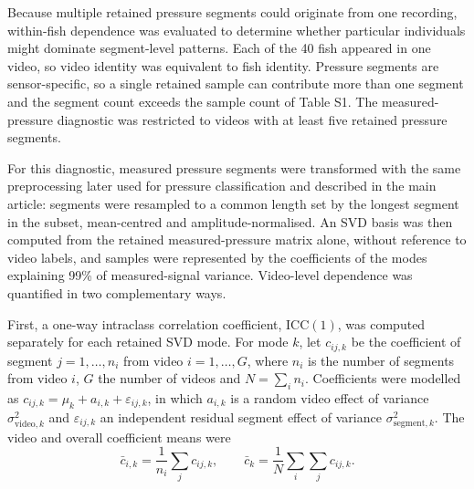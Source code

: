 \documentclass[11pt,a4paper]{article}
\begin{document}
Because multiple retained pressure segments could originate from one recording, within-fish dependence was evaluated to determine whether particular individuals might dominate segment-level patterns. Each of the 40 fish appeared in one video, so video identity was equivalent to fish identity. Pressure segments are sensor-specific, so a single retained sample can contribute more than one segment and the segment count exceeds the sample count of Table S1. The measured-pressure diagnostic was restricted to videos with at least five retained pressure segments.

For this diagnostic, measured pressure segments were transformed with the same preprocessing later used for pressure classification and described in the main article: segments were resampled to a common length set by the longest segment in the subset, mean-centred and amplitude-normalised. An SVD basis was then computed from the retained measured-pressure matrix alone, without reference to video labels, and samples were represented by the coefficients of the modes explaining 99\% of measured-signal variance. Video-level dependence was quantified in two complementary ways.

First, a one-way intraclass correlation coefficient, \(\mathrm{ICC}(1)\), was computed separately for each retained SVD mode. For mode \(k\), let \(c_{ij,k}\) be the coefficient of segment \(j=1,\dots,n_i\) from video \(i=1,\dots,G\), where \(n_i\) is the number of segments from video \(i\), \(G\) the number of videos and \(N=\sum_i n_i\). Coefficients were modelled as \(c_{ij,k}=\mu_k+a_{i,k}+\varepsilon_{ij,k}\), in which \(a_{i,k}\) is a random video effect of variance \(\sigma^2_{\mathrm{video},k}\) and \(\varepsilon_{ij,k}\) an independent residual segment effect of variance \(\sigma^2_{\mathrm{segment},k}\). The video and overall coefficient means were
\begin{equation}
\bar c_{i,k}=\frac{1}{n_i}\sum_j c_{ij,k},
\qquad
\bar c_k=\frac{1}{N}\sum_i\sum_j c_{ij,k}.
\end{equation}
\end{document}
